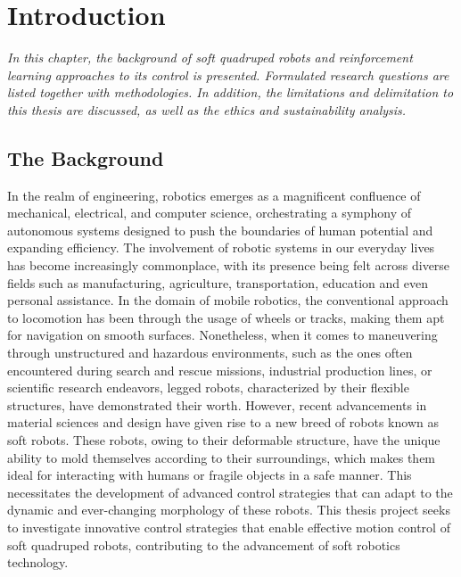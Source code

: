 
\chapter{Introduction}
\label{chap1}
\textit{In this chapter, the background of soft quadruped robots and reinforcement learning approaches to its control is presented. Formulated research questions are listed together with methodologies. In addition, the limitations and delimitation to this thesis are discussed, as well as the ethics and sustainability analysis.}

\section{The Background}
In the realm of engineering, robotics emerges as a magnificent confluence of mechanical, electrical, and computer science, orchestrating a symphony of autonomous systems designed to push the boundaries of human potential and expanding efficiency\cite{billardTrendsChallengesRobot2019}. The involvement of robotic systems in our everyday lives has become increasingly commonplace, with its presence being felt across diverse fields such as manufacturing\cite{wangCurrentResearchesFuture2018}, agriculture\cite{liDevelopmentFieldEvaluation2023}, transportation\cite{zhangFindingCriticalScenarios2023}, education\cite{riedoThymioIIRobot2013} and even personal assistance\cite{openaiGPT4TechnicalReport2023}. In the domain of mobile robotics, the conventional approach to locomotion has been through the usage of wheels or tracks, making them apt for navigation on smooth surfaces\cite{liResearchMammalBionic2011}. Nonetheless, when it comes to maneuvering through unstructured and hazardous environments, such as the ones often encountered during search and rescue missions\cite{hawkesSoftRobotThat2017}, industrial production lines\cite{huDesignQuadrupedInspection2021}, or scientific research endeavors\cite{hewingLearningbasedModelPredictive2020}, legged robots, characterized by their flexible structures, have demonstrated their worth. However, recent advancements in material sciences and design have given rise to a new breed of robots known as soft robots. These robots, owing to their deformable structure, have the unique ability to mold themselves according to their surroundings, which makes them ideal for interacting with humans or fragile objects in a safe manner\cite{muralidharanSoftQuadrupedRobot2021}. This necessitates the development of advanced control strategies that can adapt to the dynamic and ever-changing morphology of these robots\cite{wangControlStrategiesSoft2022}. This thesis project seeks to investigate innovative control strategies that enable effective motion control of soft quadruped robots, contributing to the advancement of soft robotics technology.

